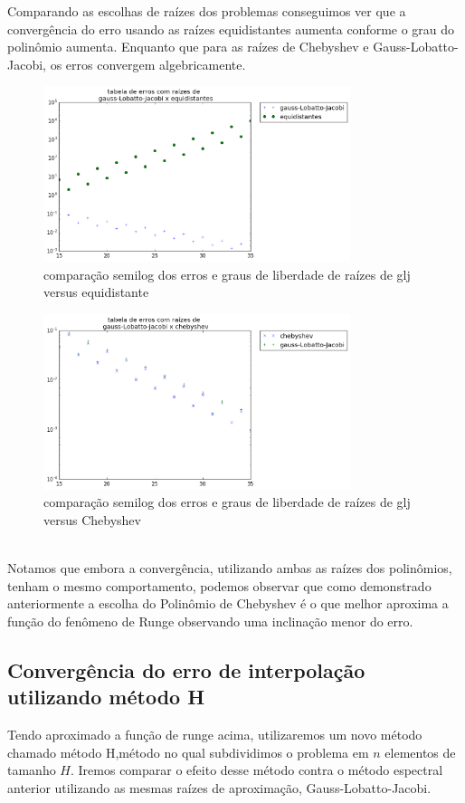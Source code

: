 Comparando as escolhas de raízes dos problemas conseguimos ver que a convergência do erro usando as raízes equidistantes aumenta conforme o grau do polinômio aumenta. Enquanto que para as raízes de Chebyshev e Gauss-Lobatto-Jacobi, os erros convergem algebricamente. 
\begin{figure}[!ht]
  \includegraphics[width=0.8\textwidth,center]{figuras/glj_equi.png}
  \caption{comparação semilog  dos erros e graus de liberdade de raízes de glj versus equidistante }
\end{figure}
\begin{figure}[!hb]
  \includegraphics[width=0.8\textwidth,center]{figuras/glj_cheb.png}
  \caption{comparação semilog  dos erros e graus de liberdade de raízes de glj versus Chebyshev}
\end{figure}
\\
Notamos que embora a convergência, utilizando ambas as raízes dos polinômios, tenham o mesmo comportamento, podemos observar que como demonstrado  anteriormente a escolha do Polinômio de Chebyshev é o que melhor aproxima a função do fenômeno de Runge observando uma inclinação menor do erro.

\subsection{Convergência do erro de interpolação utilizando método H}
 Tendo aproximado a função de runge acima, utilizaremos um novo método chamado método H,método no qual subdividimos o problema em $n$ elementos de tamanho $H$. Iremos comparar o efeito desse método contra o método espectral anterior utilizando as mesmas raízes de aproximação, Gauss-Lobatto-Jacobi.

